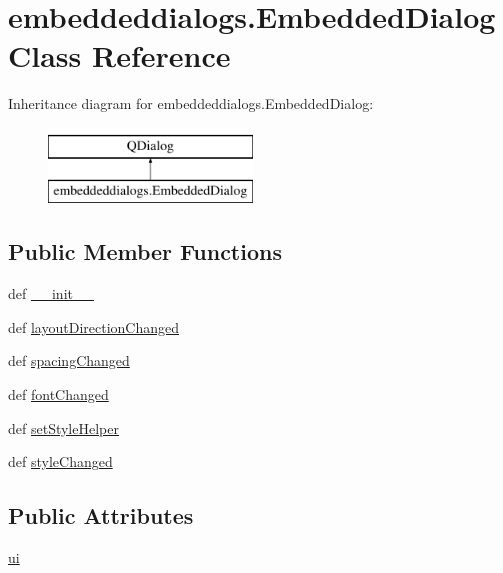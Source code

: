 \hypertarget{classembeddeddialogs_1_1EmbeddedDialog}{}\section{embeddeddialogs.\+Embedded\+Dialog Class Reference}
\label{classembeddeddialogs_1_1EmbeddedDialog}
Inheritance diagram for embeddeddialogs.\+Embedded\+Dialog\+:\begin{figure}[H]
\begin{center}
\leavevmode
\includegraphics[height=2.000000cm]{classembeddeddialogs_1_1EmbeddedDialog}
\end{center}
\end{figure}
\subsection*{Public Member Functions}
\begin{DoxyCompactItemize}
\item 
def \hyperlink{classembeddeddialogs_1_1EmbeddedDialog_a208ed22122eb9a24b87a5d9990dbc984}{\+\_\+\+\_\+init\+\_\+\+\_\+}
\item 
def \hyperlink{classembeddeddialogs_1_1EmbeddedDialog_a7a4822e4feb3a33dbf9258fbe71813a6}{layout\+Direction\+Changed}
\item 
def \hyperlink{classembeddeddialogs_1_1EmbeddedDialog_acb51f084b8a4db2069abd8f96e2c412c}{spacing\+Changed}
\item 
def \hyperlink{classembeddeddialogs_1_1EmbeddedDialog_a89d66a7bbd52d57237bb9d8c5715397a}{font\+Changed}
\item 
def \hyperlink{classembeddeddialogs_1_1EmbeddedDialog_a5d381a6f6c8129e17089ba79d8b33d83}{set\+Style\+Helper}
\item 
def \hyperlink{classembeddeddialogs_1_1EmbeddedDialog_af88c79c2a9538b8db45af4dcb46db4e9}{style\+Changed}
\end{DoxyCompactItemize}
\subsection*{Public Attributes}
\begin{DoxyCompactItemize}
\item 
\hyperlink{classembeddeddialogs_1_1EmbeddedDialog_a8de30876797551b4d193a6726fe44f4d}{ui}
\end{DoxyCompactItemize}


